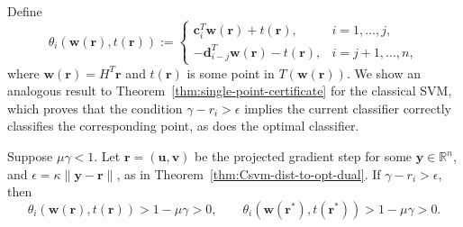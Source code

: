 \documentclass[twoside,11pt]{article}
\renewcommand{\c}{\bm{c}}
\renewcommand{\d}{\bm{d}}
\newcommand{\R}{{\mathbb{R}}} %
\renewcommand\r{\bm{r}}
\renewcommand\u{\bm{u}}
\renewcommand\v{\bm{v}}
\newcommand\w{\bm{w}}
\newcommand\y{\bm{y}}
\begin{document}
Define
\[
    \theta_i(\w(\r), t(\r)) := \begin{cases}
        \c_i^{T}\w(\r) + t(\r), & i=1,\ldots,j,\\
        -\d_{i-j}^{T}\w(\r) - t(\r),& i=j+1,\ldots,n,
    \end{cases}
\]
where $\w(\r) = H^T\r$ and $t(\r)$ is some point in $T(\w(\r))$. We show an analogous result to Theorem~\ref{thm:single-point-certificate} for the classical SVM, which proves that the condition $\gamma - r_i > \epsilon$ implies the current classifier correctly classifies the corresponding point, as does the optimal classifier.

\begin{theorem} \label{thm:Csvm-single-point-certificate}
Suppose $\mu\gamma<1$. Let $\r = (\u,\v)$ be the projected gradient step for some $\y \in \R^n$, and $\epsilon = \kappa \|\y - \r\|$, as in Theorem~\ref{thm:Csvm-dist-to-opt-dual}. If $\gamma-r_i>\epsilon$, then
\[
    \theta_i(\w(\r),t(\r)) > 1-\mu\gamma > 0, \qquad \theta_i(\w(\r^*),t(\r^*)) > 1-\mu\gamma>0.
\]
\end{theorem}
\end{document}
